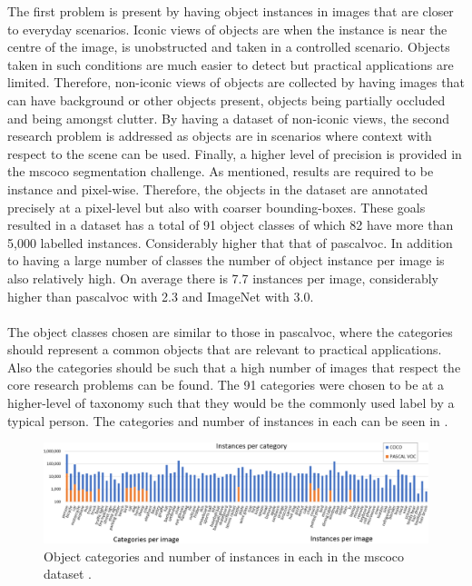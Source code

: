 The first problem is present by having object instances in images that are closer to everyday scenarios. Iconic views of objects are when the instance is near the centre of the image, is unobstructed and taken in a controlled scenario. Objects taken in such conditions are much easier to detect but practical applications are limited. Therefore, non-iconic views of objects are collected by having images that can have background or other objects present, objects being partially occluded and being amongst clutter. By having a dataset of non-iconic views, the second research problem is addressed as objects are in scenarios where context with respect to the scene can be used. Finally, a higher level of precision is provided in the \gls{mscoco} segmentation challenge. As mentioned, results are required to be instance and pixel-wise. Therefore, the objects in the dataset are annotated precisely at a pixel-level but also with coarser bounding-boxes. These goals resulted in a dataset has a total of 91 object classes of which 82 have more than 5,000 labelled instances. Considerably higher that that of \gls{pascalvoc}. In addition to having a large number of classes the number of object instance per image is also relatively high. On average there is 7.7 instances per image, considerably higher than \gls{pascalvoc} with 2.3 and ImageNet with 3.0. 
\\\\
The object classes chosen are similar to those in \gls{pascalvoc}, where the categories should represent a common objects that are relevant to practical applications. Also the categories should be such that a high number of images that respect the core research problems can be found. The 91 categories were chosen to be at a higher-level of taxonomy such that they would be the commonly used label by a typical person. The categories and number of instances in each can be seen in .

\begin{figure}[H]
  \centering
    \includegraphics[width=1.0\textwidth]{Figs/Problem/mscoco_cats.pdf}
    \caption{Object categories and number of instances in each in the \gls{mscoco} dataset \cite{mscoco}.}
    \label{fig:cocoinstances}
\end{figure}


